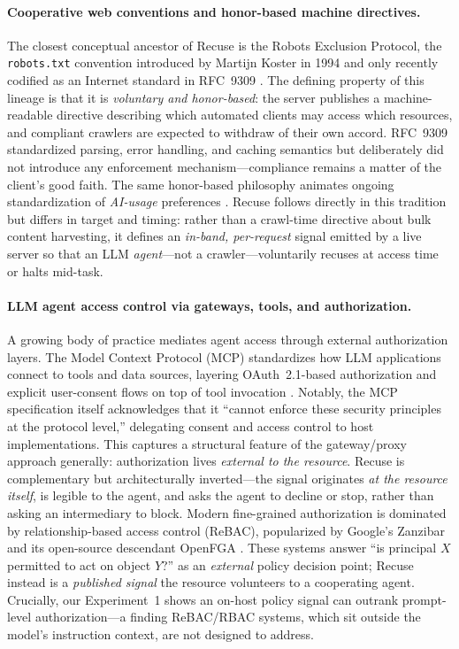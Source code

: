 \documentclass{article}
\begin{document}
\paragraph{Cooperative web conventions and honor-based machine directives.}
The closest conceptual ancestor of Recuse is the Robots Exclusion Protocol, the
\texttt{robots.txt} convention introduced by Martijn Koster in 1994 and only
recently codified as an Internet standard in RFC~9309 \citep{rfc9309}. The
defining property of this lineage is that it is \emph{voluntary and honor-based}:
the server publishes a machine-readable directive describing which automated
clients may access which resources, and compliant crawlers are expected to
withdraw of their own accord. RFC~9309 standardized parsing, error handling, and
caching semantics but deliberately did not introduce any enforcement
mechanism---compliance remains a matter of the client's good faith. The same
honor-based philosophy animates ongoing standardization of \emph{AI-usage}
preferences \citep{aipref-attach}. Recuse follows directly in this tradition but
differs in target and timing: rather than a crawl-time directive about bulk
content harvesting, it defines an \emph{in-band, per-request} signal emitted by a
live server so that an LLM \emph{agent}---not a crawler---voluntarily recuses at
access time or halts mid-task.

\paragraph{LLM agent access control via gateways, tools, and authorization.}
A growing body of practice mediates agent access through external authorization
layers. The Model Context Protocol (MCP) standardizes how LLM applications
connect to tools and data sources, layering OAuth~2.1-based authorization and
explicit user-consent flows on top of tool invocation \citep{mcp2025}. Notably,
the MCP specification itself acknowledges that it ``cannot enforce these security
principles at the protocol level,'' delegating consent and access control to host
implementations. This captures a structural feature of the gateway/proxy approach
generally: authorization lives \emph{external to the resource}. Recuse is
complementary but architecturally inverted---the signal originates \emph{at the
resource itself}, is legible to the agent, and asks the agent to decline or stop,
rather than asking an intermediary to block. Modern fine-grained authorization is
dominated by relationship-based access control (ReBAC), popularized by Google's
Zanzibar \citep{pang2019zanzibar} and its open-source descendant OpenFGA
\citep{openfga}. These systems answer ``is principal $X$ permitted to act on
object $Y$?'' as an \emph{external} policy decision point; Recuse instead is a
\emph{published signal} the resource volunteers to a cooperating agent.
Crucially, our Experiment~1 shows an on-host policy signal can outrank
prompt-level authorization---a finding ReBAC/RBAC systems, which sit outside the
model's instruction context, are not designed to address.
\end{document}
